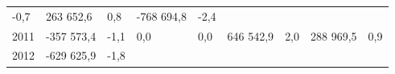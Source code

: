 \begin{longtable}[]{@{}lllllllll@{}}
\begin{minipage}[t]{0.06\columnwidth}
-0,7\strut
\end{minipage} & \begin{minipage}[t]{0.12\columnwidth}\raggedright
263 652,6\strut
\end{minipage} & \begin{minipage}[t]{0.06\columnwidth}\raggedright
0,8\strut
\end{minipage} & \begin{minipage}[t]{0.10\columnwidth}\raggedright
-768 694,8\strut
\end{minipage} & \begin{minipage}[t]{0.06\columnwidth}\raggedright
-2,4\strut
\end{minipage}\tabularnewline
\begin{minipage}[t]{0.05\columnwidth}\raggedright
2011\strut
\end{minipage} & \begin{minipage}[t]{0.10\columnwidth}\raggedright
-357 573,4\strut
\end{minipage} & \begin{minipage}[t]{0.06\columnwidth}\raggedright
-1,1\strut
\end{minipage} & \begin{minipage}[t]{0.16\columnwidth}\raggedright
0,0\strut
\end{minipage} & \begin{minipage}[t]{0.06\columnwidth}\raggedright
0,0\strut
\end{minipage} & \begin{minipage}[t]{0.12\columnwidth}\raggedright
646 542,9\strut
\end{minipage} & \begin{minipage}[t]{0.06\columnwidth}\raggedright
2,0\strut
\end{minipage} & \begin{minipage}[t]{0.10\columnwidth}\raggedright
288 969,5\strut
\end{minipage} & \begin{minipage}[t]{0.06\columnwidth}\raggedright
0,9\strut
\end{minipage}\tabularnewline
\begin{minipage}[t]{0.05\columnwidth}\raggedright
2012\strut
\end{minipage} & \begin{minipage}[t]{0.10\columnwidth}\raggedright
-629 625,9\strut
\end{minipage} & \begin{minipage}[t]{0.06\columnwidth}\raggedright
-1,8\strut
\end{minipage} & \begin{minipage}[t]{0.16\columnwidth}\raggedright

\end{minipage}
\end{longtable}
